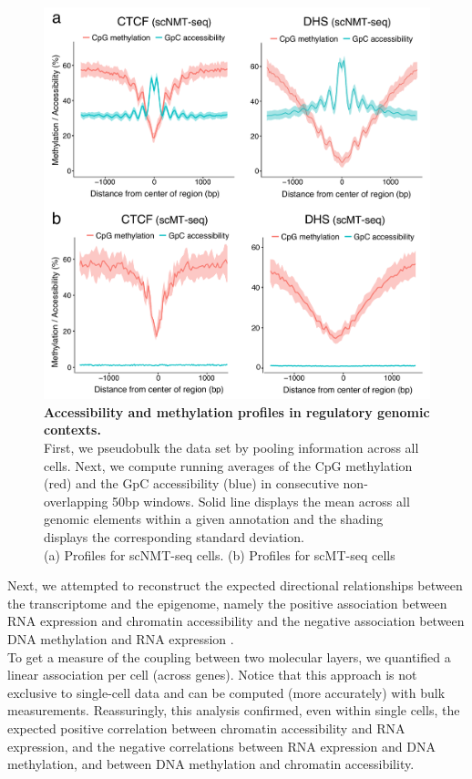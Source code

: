 \begin{figure}[H]
	\centering
	\includegraphics[width=0.7\linewidth]{scnmt_pseudobulk_profiles}
	\caption[]{\textbf{Accessibility and methylation profiles in regulatory genomic contexts.}\\
	First, we pseudobulk the data set by pooling information across all cells. Next, we compute running averages of the CpG methylation (red) and the GpC accessibility (blue) in consecutive non-overlapping 50bp windows. Solid line displays the mean across all genomic elements within a given annotation and the shading displays the corresponding standard deviation.\\
	(a) Profiles for scNMT-seq cells. (b) Profiles for scMT-seq cells
	}
	\label{fig:scnmt_pseudobulked_profiles}
\end{figure}

Next, we attempted to reconstruct the expected directional relationships between the transcriptome and the epigenome, namely the positive association between RNA expression and chromatin accessibility and the negative association between DNA methylation and RNA expression \cite{Thurman2012,Angermueller2016}.\\
To get a measure of the coupling between two molecular layers, we quantified a linear association per cell (across genes). Notice that this approach is not exclusive to single-cell data and can be computed (more accurately) with bulk measurements. Reassuringly, this analysis confirmed, even within single cells, the expected positive correlation between chromatin accessibility and RNA expression, and the negative correlations between RNA expression and DNA methylation, and between DNA methylation and chromatin accessibility.

